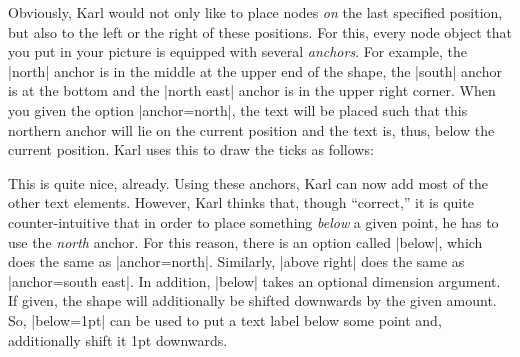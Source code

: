 \begin{codeexample}[]
\end{codeexample}

Obviously, Karl would not only like to place nodes \emph{on} the last
specified position, but also to the left or the 
right of these positions. For this, every node object that you
put in your picture is equipped with several \emph{anchors}. For
example, the |north| anchor is in the middle at the upper end of the shape,
the |south| anchor is at the bottom and the |north east| anchor is in
the upper right corner. When you given the option |anchor=north|, the
text will be placed such that this northern anchor will lie on the
current position and the text is, thus, below the current
position. Karl uses this to draw the ticks as follows:

\begin{codeexample}[]
\end{codeexample}

This is quite nice, already. Using these anchors, Karl can now add
most of the other text elements. However, Karl thinks that, though
``correct,'' it is quite counter-intuitive that in order to place something
\emph{below} a given point, he has to use the \emph{north} anchor. For
this reason, there is an option called |below|, which does the
same as |anchor=north|. Similarly, |above right| does the same as
|anchor=south east|. In addition, |below| takes an optional
dimension argument. If given, the shape will additionally be shifted
downwards by the given amount. So, |below=1pt| can be used to put
a text label below some point and, additionally shift it  1pt
downwards. 

